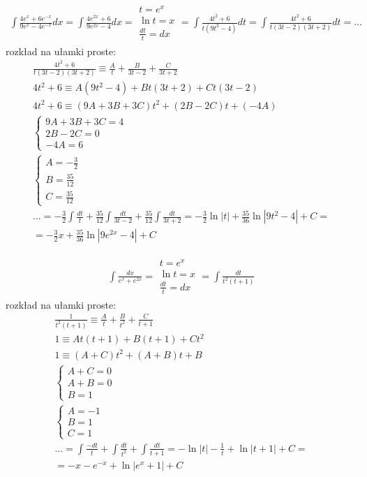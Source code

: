 \begin{gather*}\int \frac{4e^x+6e^{-x}}{9e^x-4e^{-x}}dx = \int \frac{4e^{2x}+6}{9e^{2x}-4}dx =\begin{array}{|l|}
t=e^x \\
\ln t = x \\
\frac{dt}{t} = dx
\end{array}= \int \frac{4t^2+6}{t(9t^2-4)}dt = \int \frac{4t^2+6}{t(3t-2)(3t+2)}dt=...\end{gather*}
rozkład na ułamki proste:
\begin{gather*}\nonumber \frac{4t^2+6}{t(3t-2)(3t+2)} \equiv \frac{A}{t}+\frac{B}{3t-2}+\frac{C}{3t+2} \\
4t^2+6 \equiv A(9t^2-4)+Bt(3t+2)+Ct(3t-2) \\
4t^2+6 \equiv (9A+3B+3C)t^2+(2B-2C)t+(-4A) \\
\begin{cases} 9A+3B+3C=4 \\ 2B-2C=0 \\ -4A=6 \end{cases} \\
\begin{cases} A=-\frac{3}{2} \\ B=\frac{35}{12} \\ C=\frac{35}{12} \end{cases} \\
\nonumber ... = -\frac{3}{2}\int \frac{dt}{t}+\frac{35}{12}\int \frac{dt}{3t-2} + \frac{35}{12} \int \frac{dt}{3t+2} = -\frac{3}{2}\ln|t|+\frac{35}{36}\ln|9t^2-4|+C = \\ = -\frac{3}{2}x+\frac{35}{36}\ln|9e^{2x}-4|+C\end{gather*}



\begin{gather*}\int \frac{dx}{e^x+e^{2x}} =\begin{array}{|l|}
t=e^x \\
\ln t = x \\
\frac{dt}{t} = dx
\end{array}= \int \frac{dt}{t^2(t+1)}\end{gather*}
rozkład na ułamki proste:
\begin{gather*}\nonumber \frac{1}{t^2(t+1)} \equiv \frac{A}{t}+\frac{B}{t^2}+\frac{C}{t+1} \\
1 \equiv At(t+1)+B(t+1)+Ct^2 \\
1 \equiv (A+C)t^2+(A+B)t+B \\
\begin{cases} A+C=0 \\ A+B=0 \\ B=1 \end{cases} \\
\begin{cases} A=-1 \\ B=1 \\ C=1 \end{cases} \\
\nonumber ...=\int \frac{-dt}{t}+\int \frac{dt}{t^2}+\int \frac{dt}{t+1} = -\ln|t|-\frac{1}{t}+\ln|t+1|+C = \\ = -x-e^{-x}+\ln|e^x+1|+C\end{gather*}



